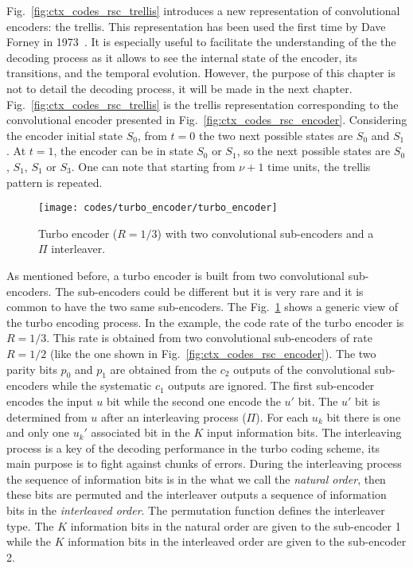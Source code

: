 Fig.~\ref{fig:ctx_codes_rsc_trellis} introduces a new representation of
convolutional encoders: the trellis. This representation has been used the first
time by Dave Forney in 1973~\cite{Forney1973}. It is especially useful to
facilitate the understanding of the the decoding process as it allows to see the
internal state of the encoder, its transitions, and the temporal evolution.
However, the purpose of this chapter is not to detail the decoding process, it
will be made in the next chapter. Fig.~\ref{fig:ctx_codes_rsc_trellis} is the
trellis representation corresponding to the convolutional encoder presented in
Fig.~\ref{fig:ctx_codes_rsc_encoder}. Considering the encoder initial state
$S_0$, from $t = 0$ the two next possible states are $S_0$ and $S_1$. At
$t = 1$, the encoder can be in state $S_0$ or $S_1$, so the next possible states
are $S_0$, $S_1$, $S_1$ or $S_3$. One can note that starting from $\nu +1$ time
units, the trellis pattern is repeated.

\begin{figure}[htp]
  \centering
  \texttt{[image: codes/turbo\_encoder/turbo\_encoder]}
  \caption{Turbo encoder ($R = 1/3$) with two convolutional sub-encoders and a
    $\Pi$ interleaver.}
  \label{fig:ctx_codes_turbo_encoder}
\end{figure}

As mentioned before, a turbo encoder is built from two convolutional
sub-encoders. The sub-encoders could be different but it is very rare and it is
common to have the two same sub-encoders. The
Fig.~\ref{fig:ctx_codes_turbo_encoder} shows a generic view of the turbo
encoding process. In the example, the code rate of the turbo encoder is
$R = 1/3$. This rate is obtained from two convolutional sub-encoders of rate
$R = 1/2$ (like the one shown in Fig.~\ref{fig:ctx_codes_rsc_encoder}). The two
parity bits $p_0$ and $p_1$ are obtained from the $c_2$ outputs of the
convolutional sub-encoders while the systematic $c_1$ outputs are ignored. The
first sub-encoder encodes the input $u$ bit while the second one encode the $u'$
bit. The $u'$ bit is determined from $u$ after an interleaving process ($\Pi$).
For each $u_k$ bit there is one and only one $u_k'$ associated bit in the $K$
input information bits. The interleaving process is a key of the decoding
performance in the turbo coding scheme, its main purpose is to fight against
chunks of errors. During the interleaving process the sequence of information
bits is in the what we call the \emph{natural order}, then these bits are
permuted and the interleaver outputs a sequence of information bits in the
\emph{interleaved order}. The permutation function defines the interleaver type.
The $K$ information bits in the natural order are given to the sub-encoder 1
while the $K$ information bits in the interleaved order are given to the
sub-encoder 2.

